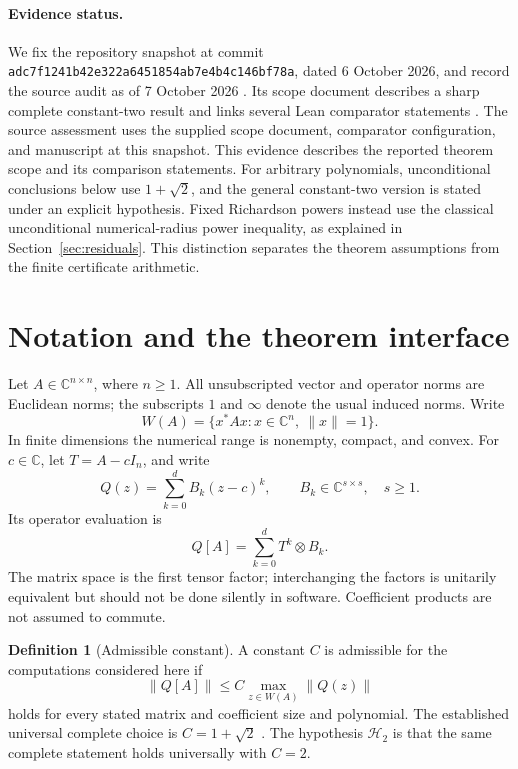\documentclass[11pt]{article}
\newcommand{\C}{\mathbb C}
\newcommand{\norm}[1]{\lVert #1\rVert}
\newcommand{\W}{W}
\newcommand{\cbase}{1+\sqrt{2}}
\newcommand{\HH}{\mathcal H}
\theoremstyle{definition}
\newtheorem{definition}[theorem]{Definition}
\theoremstyle{remark}
\numberwithin{equation}{section}
\begin{document}
\paragraph{Evidence status.}
We fix the repository snapshot at commit
\nolinkurl{adc7f1241b42e322a6451854ab7e4b4c146bf78a}, dated
6 October 2026, and record the source audit as of 7 October 2026
\citep{OpenAIRepository2026}. Its scope document describes a sharp complete
constant-two result and links several Lean comparator statements
\citep{OpenAIScope325}. The source assessment uses the supplied scope
document, comparator configuration, and manuscript at this snapshot.
This evidence describes the reported theorem scope and its comparison
statements. For arbitrary polynomials, unconditional conclusions below use
\(\cbase\), and the general constant-two version is stated under an
explicit hypothesis. Fixed Richardson powers instead use the classical
unconditional numerical-radius power inequality, as explained in
Section~\ref{sec:residuals}. This distinction separates the theorem
assumptions from the finite certificate arithmetic.

\section{Notation and the theorem interface}\label{sec:notation}
Let \(A\in\C^{n\times n}\), where \(n\ge1\).
All unsubscripted vector and operator norms are Euclidean norms;
the subscripts \(1\) and \(\infty\) denote the usual induced norms.
Write
\[
 \W(A)=\{x^*Ax:x\in\C^n,\ \norm{x}=1\}.
\]
In finite dimensions the numerical range is nonempty, compact, and convex.
For \(c\in\C\), let \(T=A-cI_n\), and write
\[
 Q(z)=\sum_{k=0}^{d} B_k(z-c)^k,\qquad
 B_k\in\C^{s\times s},\quad s\ge1.
\]
Its operator evaluation is
\begin{equation}\label{eq:evaluation}
 Q[A]=\sum_{k=0}^{d} T^k\otimes B_k.
\end{equation}
The matrix space is the first tensor factor; interchanging the factors is
unitarily equivalent but should not be done silently in software.
Coefficient products are not assumed to commute.

\begin{definition}[Admissible constant]\label{def:constant}
A constant \(C\) is admissible for the computations considered here if
\[
 \norm{Q[A]}\le C\max_{z\in\W(A)}\norm{Q(z)}
\]
holds for every stated matrix and coefficient size and polynomial.
The established universal complete choice is \(C=\cbase\)
\citep{CrouzeixPalencia2017}. The hypothesis \(\HH_2\) is that the same
complete statement holds universally with \(C=2\).
\end{definition}
\end{document}
